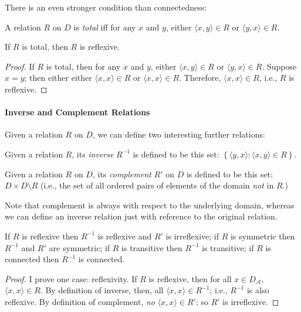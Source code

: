 There is an even stronger condition than connectedness: \begin{definition}[Totality]
  A relation $R$ on $D$ is \emph{total} iff for any $x$ and $y$, either $\langle x,y\rangle \in R$ or $\langle y,x\rangle \in R$.
\end{definition}\begin{theorem}\label{tot}
  If $R$ is total, then $R$ is reflexive.
  \begin{proof}
     If $R$ is total, then for any $x$ and $y$, either $\langle x,y\rangle \in R$ or $\langle y,x\rangle \in R$. Suppose $x=y$; then either either $\langle x,x\rangle \in R$ or $\langle x,x\rangle \in R$. Therefore, $\langle x,x\rangle \in R$, i.e., $R$ is reflexive.
   \end{proof} 
\end{theorem}

\paragraph{Inverse and Complement Relations}

Given a relation $R$ on $D$, we can define two interesting further relations: \begin{definition}[Inverse]
Given a relation $R$, its \emph{inverse} $R^{-1}$ is defined to be this set: $\left\{\langle y,x\rangle:\langle x,y\rangle \in R\right\}$. \end{definition}
\begin{definition}[Complement]
Given a relation $R$ on $D$, its \emph{complement} $R'$ on $D$ is defined to be this set: $D \times D \setminus R$ (i.e., the set of all ordered pairs of elements of the domain \emph{not} in $R$.)
 \end{definition} Note that complement is always with respect to the underlying domain, whereas we can define an inverse relation just with reference to the original relation.

\begin{theorem}
	If $R$ is reflexive then $R^{-1}$ is reflexive and $R'$ is irreflexive; if $R$ is symmetric then $R^{-1}$ and $R'$ are symmetric; if $R$ is transitive then $R^{-1}$ is transitive; if $R$ is connected then $R^{-1}$ is connected.
\begin{proof}
	I prove one case: reflexivity. If $R$ is reflexive, then for all $x \in D_{\mathscr{A}}$, $\langle x,x\rangle \in R$. By definition of inverse, then, all $\langle x,x\rangle \in R^{-1}$; i.e., $R^{-1}$ is also reflexive.  By definition of complement, \emph{no} $\langle x,x\rangle \in R'$; so $R'$ is irreflexive.
\end{proof}\end{theorem}



